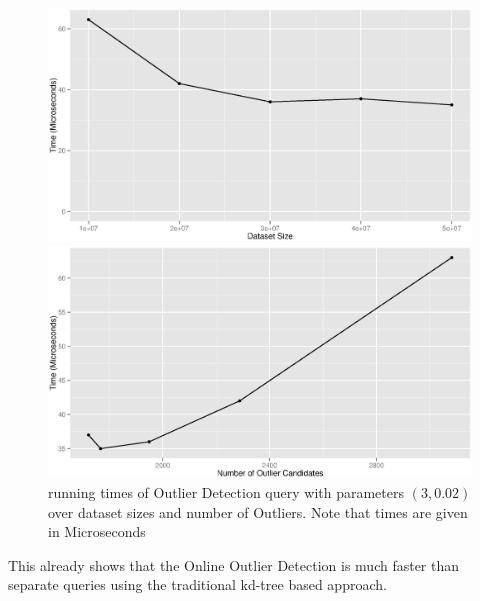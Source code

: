 \documentclass[runningheads]{llncs}
\begin{document}
\begin{figure}
\centering
\begin{minipage}{.5\textwidth}
\includegraphics[width=\linewidth]{images/ospace_od_time_dataset}
\end{minipage}\begin{minipage}{.5\textwidth}
\includegraphics[width=\linewidth]{images/ospace_od_time_ocs}
\end{minipage}
\caption{running times of Outlier Detection query with parameters $(3,0.02)$ over dataset sizes and number of Outliers. Note that times are given in Microseconds}
\end{figure}

This already shows that the Online Outlier Detection is much faster than separate queries using the traditional kd-tree based approach.
\end{document}
